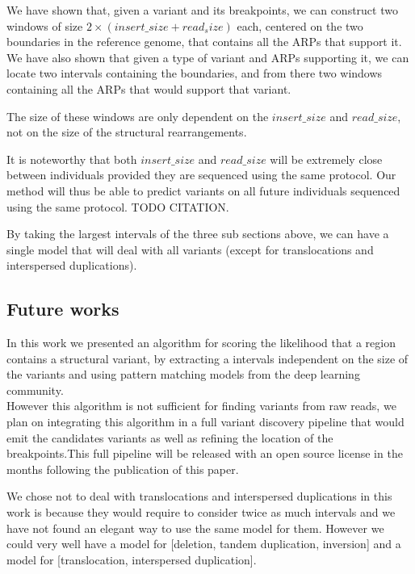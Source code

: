 \documentclass{article}
\begin{document}
We have shown that, given a variant and its breakpoints, we can construct two windows of size $2 \times (insert\_size + read_size)$ each, centered on the two boundaries in the reference genome, that contains all the ARPs that support it.\\

We have also shown that given a type of variant and ARPs supporting it, we can locate two intervals containing the boundaries, and from there two windows containing all the ARPs that would support that variant.

The size of these windows are only dependent on the $insert\_size$ and $read\_size$, not on the size of the structural rearrangements.

It is noteworthy that both $insert\_size$ and $read\_size$ will be extremely close between individuals provided they are sequenced using the same protocol. Our method will thus be able to predict variants on all future individuals sequenced using the same protocol. TODO CITATION.

By taking the largest intervals of the three sub sections above, we can have a single model that will deal with all variants (except for translocations and interspersed duplications).

\subsection{Future works}

In this work we presented an algorithm for scoring the likelihood that a region contains a structural variant, by extracting a intervals independent on the size of the variants and using pattern matching models from the deep learning community.\\
However this algorithm is not sufficient for finding variants from raw reads, we plan on integrating this algorithm in a full variant discovery pipeline that would emit the candidates variants as well as refining the location of the breakpoints.This full pipeline will be released with an open source license in the months following the publication of this paper.

We chose not to deal with translocations and interspersed duplications in this work is because they would require to consider twice as much intervals and we have not found an elegant way to use the same model for them. However we could very well have a model for [deletion, tandem duplication, inversion] and a model for [translocation, interspersed duplication].
\end{document}

